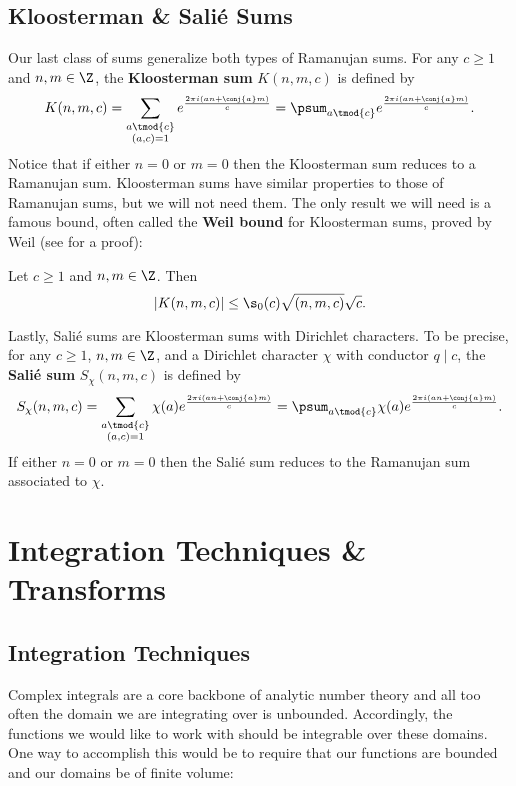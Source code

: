       \subsection*{Kloosterman \& Sali\'e Sums}
        Our last class of sums generalize both types of Ramanujan sums. For any $c \ge 1$ and $n,m \in \Z$, the \textbf{Kloosterman sum} $K(n,m,c)$ is defined by
        \[
          K(n,m,c) = \sum_{\substack{a \tmod{c} \\ (a,c) = 1}}e^{\frac{2\pi i(an+\conj{a}m)}{c}} = \psum_{a \tmod{c}}e^{\frac{2\pi i(an+\conj{a}m)}{c}}.
        \]
        Notice that if either $n = 0$ or $m = 0$ then the Kloosterman sum reduces to a Ramanujan sum. Kloosterman sums have similar properties to those of Ramanujan sums, but we will not need them. The only result we will need is a famous bound, often called the \textbf{Weil bound} for Kloosterman sums, proved by Weil (see \cite{weil1948some} for a proof):

        \begin{theorem}
          Let $c \ge 1$ and $n,m \in \Z$. Then
          \[
            |K(n,m,c)| \le \s_{0}(c)\sqrt{(n,m,c)}\sqrt{c}.
          \]
        \end{theorem}

        Lastly, Sali\'e sums are Kloosterman sums with Dirichlet characters. To be precise, for any $c \ge 1$, $n,m \in \Z$, and a Dirichlet character $\chi$ with conductor $q \mid c$, the \textbf{Sali\'e sum} $S_{\chi}(n,m,c)$ is defined by
        \[
          S_{\chi}(n,m,c) = \sum_{\substack{a \tmod{c} \\ (a,c) = 1}}\chi(a)e^{\frac{2\pi i(an+\conj{a}m)}{c}} = \psum_{a \tmod{c}}\chi(a)e^{\frac{2\pi i(an+\conj{a}m)}{c}}.
        \]
        If either $n = 0$ or $m = 0$ then the Sali\'e sum reduces to the Ramanujan sum associated to $\chi$.
    \section{Integration Techniques \& Transforms}
      \subsection*{Integration Techniques}
        Complex integrals are a core backbone of analytic number theory and all too often the domain we are integrating over is unbounded. Accordingly, the functions we would like to work with should be integrable over these domains. One way to accomplish this would be to require that our functions are bounded and our domains be of finite volume:

